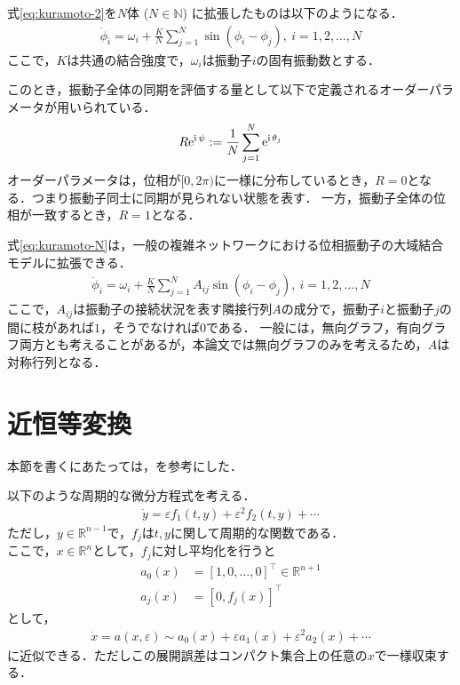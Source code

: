 \documentclass[../main]{subfiles}
\begin{document}
式\eqref{eq:kuramoto-2}を$N$体 ($N\in\mathbb{N}$) に拡張したものは以下のようになる．
\begin{align}
    \label{eq:kuramoto-N}
    \dot{\phi}_i=\omega_i+\frac{K}{N}\sum_{j=1}^N\sin(\phi_i-\phi_j),\ i=1,2,\ldots,N
\end{align}
ここで，$K$は共通の結合強度で，$\omega_i$は振動子$i$の固有振動数とする．

このとき，振動子全体の同期を評価する量として以下で定義されるオーダーパラメータが用いられている．
\begin{align*}
    R\mathrm{e}^{{\mathrm i\,} \psi}:=\frac{1}{N}\sum_{j=1}^N\mathrm{e}^{{\mathrm i\,} \theta_j}    
\end{align*}
オーダーパラメータは，位相が$[0,2\pi)$に一様に分布しているとき，$R= 0$となる．つまり振動子同士に同期が見られない状態を表す．
一方，振動子全体の位相が一致するとき，$R=1$となる．

式\eqref{eq:kuramoto-N}は，一般の複雑ネットワークにおける位相振動子の大域結合モデルに拡張できる．
\begin{align*}
    \dot{\phi}_i=\omega_i+\frac{K}{N}\sum_{j=1}^NA_{ij}\sin(\phi_i-\phi_j),\ i=1,2,\ldots,N
\end{align*}
ここで，$A_{ij}$は振動子の接続状況を表す隣接行列$A$の成分で，振動子$i$と振動子$j$の間に枝があれば$1$，そうでなければ$0$である．
一般には，無向グラフ，有向グラフ両方とも考えることがあるが，本論文では無向グラフのみを考えるため，$A$は対称行列となる．
\section{近恒等変換}
本節を書くにあたっては，\cite{james2003}を参考にした．

以下のような周期的な微分方程式を考える．
\begin{align*}
    \dot{y}=\varepsilon f_1(t,y)+\varepsilon^2f_2(t,y)+\cdots
\end{align*}
ただし，$y\in\mathbb{R}^{n-1}$で，$f_j$は$t,y$に関して周期的な関数である．\\
ここで，$x\in\mathbb{R}^{n}$として，$f_j$に対し平均化を行うと
\begin{align*}
    a_0(x)&=[1,0,\ldots,0]^\top\in\mathbb{R}^{n+1}\\
    a_j(x)&=[0,f_j(x)]^\top
\end{align*}
として，
\begin{align*}
    \dot{x}=a(x,\varepsilon)\sim a_0(x)+\varepsilon a_1(x)+\varepsilon^2 a_2(x)+\cdots
\end{align*}
に近似できる．ただしこの展開誤差はコンパクト集合上の任意の$x$で一様収束する．
\end{document}
